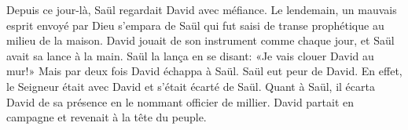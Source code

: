 Depuis ce jour-là, Saül regardait David avec méfiance.
Le lendemain, un mauvais esprit envoyé par Dieu s’empara de Saül
	qui fut saisi de transe prophétique au milieu de la maison.
David jouait de son instrument comme chaque jour, et Saül avait sa lance à la main.
Saül la lança en se disant: «Je vais clouer David au mur!»
	Mais par deux fois David échappa à Saül.
Saül eut peur de David.
	En effet, le Seigneur était avec David et s’était écarté de Saül.
Quant à Saül, il écarta David de sa présence en le nommant officier de millier.
	David partait en campagne et revenait à la tête du peuple.
